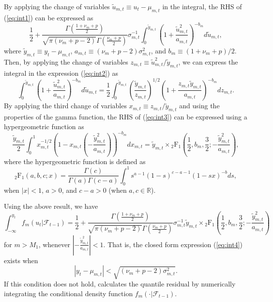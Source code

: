 \documentclass[nojss]{jss} %
\begin{document}
\begin{appendix}
By applying the change of variables $\tilde{u}_{m,t}\equiv u_t - \mu_{m,t}$ in the integral, the RHS of (\ref{eq:int1}) can be expressed as
%
\begin{equation}\label{eq:int2}
\frac{1}{2} + \frac{\Gamma\left(\frac{1 + \nu_m + p}{2}\right)}{\sqrt{\pi(\nu_m + p - 2)}\Gamma\left(\frac{\nu_m + p}{2}\right)}\sigma_{m,t}^{-1} \int_{0}^{\tilde{y}_{m,t}}\left(1 + \frac{\tilde{u}_{m,t}^2}{a_{m,t}} \right)^{-b_m} d \tilde{u}_{m,t},
\end{equation}
%
where $\tilde{y}_{m,t} \equiv y_t - \mu_{m,t}$, $a_{m,t}\equiv (\nu_m + p - 2)\sigma_{m,t}^2$, and $b_{m}\equiv (1 + \nu_m + p)/2$. Then, by applying the change of variables $z_{m,t}\equiv \tilde{u}_{m,t}^2/\tilde{y}_{m,t}$, we can express the integral in the expression (\ref{eq:int2}) as
%
\begin{equation}\label{eq:int3}
\int_{0}^{\tilde{y}_{m,t}}\left(1 + \frac{\tilde{u}_{m,t}^2}{a_{m,t}} \right)^{-b_m} d \tilde{u}_{m,t} = \frac{1}{2} \int_{0}^{\tilde{y}_{m,t}} \left(\frac{\tilde{y}_{m,t}}{z_{m,t}}\right)^{1/2}\left(1 + \frac{z_{m,t}\tilde{y}_{m,t}}{a_{m,t}}\right)^{-b_m}d z_{m,t}.
\end{equation}
%
By applying the third change of variables $x_{m,t}\equiv z_{m,t}/\tilde{y}_{m,t}$ and using the properties of the gamma function, the RHS of (\ref{eq:int3}) can be expressed using a hypergeometric function as
%
\begin{equation}
\frac{\tilde{y}_{m,t}}{2}\int_{0}^{1}x_{m,t}^{-1/2}\left(1-x_{m,t}\left(-\frac{\tilde{y}_{m,t}^2}{a_{m,t}} \right) \right)^{-b_{m}} dx_{m,t}=\tilde{y}_{m,t} \times {}_2\text{F}_1\left(\frac{1}{2},b_{m},\frac{3}{2};-\frac{\tilde{y}_{m,t}^2}{a_{m,t}} \right),
\end{equation}
%
where the hypergeometric function is defined as \citep[Section 1.3.1]{Aomoto+Kita:2011}
\begin{equation}
{}_2\text{F}_1\left(a,b,c;x \right) = \frac{\Gamma(c)}{\Gamma(a)\Gamma(c-a)}\int_{0}^{1}s^{a-1}(1-s)^{c-a-1}(1-sx)^{-b} ds,
\end{equation}
when $|x|<1$, $a>0$, and $c-a>0$ (when $a,c\in\mathbb{R}$).

Using the above result, we have
\begin{equation}\label{eq:int4}
\int_{-\infty}^{y_t} f_m(u_t|\mathcal{F}_{t-1}) = \frac{1}{2} + \frac{\Gamma\left(\frac{1 + \nu_m + p}{2}\right)}{\sqrt{\pi(\nu_m + p - 2)}\Gamma\left(\frac{\nu_m + p}{2}\right)}\sigma_{m,t}^{-1} \tilde{y}_{m,t} \times {}_2\text{F}_1\left(\frac{1}{2},b_{m},\frac{3}{2};-\frac{\tilde{y}_{m,t}^2}{a_{m,t}}\right)
\end{equation}
for $m>M_1$, whenever $\left|-\frac{\tilde{y}_{m,t}^2}{a_{m,t}}\right|<1$. That is, the closed form expression (\ref{eq:int4}) exists when
\begin{equation}\label{eq:qrescond}
|y_t - \mu_{m,t}| < \sqrt{(\nu_m + p - 2)\sigma_{m,t}^2}.
\end{equation}
If this condition does not hold,  calculates the quantile residual by numerically integrating the conditional density function $f_m(\cdot|\mathcal{F}_{t-1})$.
\end{appendix}
\end{document}
